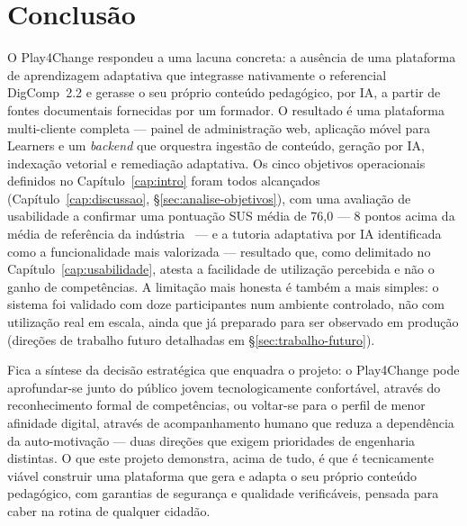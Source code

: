 %
%
\chapter{Conclusão} \label{cap:conclusao}

O Play4Change respondeu a uma lacuna concreta: a ausência de uma plataforma de aprendizagem adaptativa que integrasse nativamente o referencial DigComp~2.2 e gerasse o seu próprio conteúdo pedagógico, por IA, a partir de fontes documentais fornecidas por um formador. O resultado é uma plataforma multi-cliente completa --- painel de administração web, aplicação móvel para Learners e um \textit{backend} que orquestra ingestão de conteúdo, geração por IA, indexação vetorial e remediação adaptativa. Os cinco objetivos operacionais definidos no Capítulo~\ref{cap:intro} foram todos alcançados (Capítulo~\ref{cap:discussao}, §\ref{sec:analise-objetivos}), com uma avaliação de usabilidade a confirmar uma pontuação SUS média de 76,0 --- 8 pontos acima da média de referência da indústria~\cite{nngroup2018} --- e a tutoria adaptativa por IA identificada como a funcionalidade mais valorizada --- resultado que, como delimitado no Capítulo~\ref{cap:usabilidade}, atesta a facilidade de utilização percebida e não o ganho de competências.
A limitação mais honesta é também a mais simples: o sistema foi validado com doze participantes num ambiente controlado, não com utilização real em escala, ainda que já preparado para ser observado em produção (direções de trabalho futuro detalhadas em §\ref{sec:trabalho-futuro}).

Fica a síntese da decisão estratégica que enquadra o projeto: o Play4Change pode aprofundar-se junto do público jovem tecnologicamente confortável, através do reconhecimento formal de competências, ou voltar-se para o perfil de menor afinidade digital, através de acompanhamento humano que reduza a dependência da auto-motivação --- duas direções que exigem prioridades de engenharia distintas. O que este projeto demonstra, acima de tudo, é que é tecnicamente viável construir uma plataforma que gera e adapta o seu próprio conteúdo pedagógico, com garantias de segurança e qualidade verificáveis, pensada para caber na rotina de qualquer cidadão.
